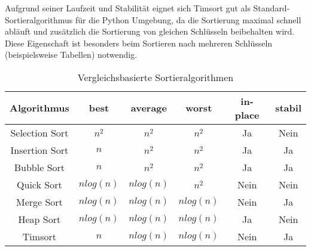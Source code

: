 \begin{description}
Aufgrund seiner Laufzeit und Stabilität eignet sich Timsort gut als Standard-Sortieralgorithmus für die Python Umgebung, da die Sortierung maximal schnell abläuft und zusätzlich die Sortierung von gleichen Schlüsseln beibehalten wird. Diese Eigenschaft ist besonders beim Sortieren nach mehreren Schlüsseln (beispielsweise Tabellen) notwendig.
\begin{table}[H]
\centering
\begin{tabular}{|c|c|c|c|c|c|}
\hline
Algorithmus & best & average & worst & in-place & stabil \\ \hline
Selection Sort & $n^2$ & $n^2$ & $n^2$ & Ja & Nein \\ \hline
Insertion Sort & $n$ &$ n^2$ &$ n^2$ & Ja & Ja \\ \hline
Bubble Sort & $n$ & $n^2$ & $n^2$ & Ja & Ja \\ \hline
Quick Sort & $n log(n)$ & $n log(n)$ & $n^2$ & Nein & Nein \\ \hline
Merge Sort & $n log(n)$ & $n log(n)$ & $n log(n)$ & Nein & Ja \\ \hline
Heap Sort & $n log(n)$ & $n log(n)$ & $n log(n)$ & Ja & Nein \\ \hline
Timsort & $n$ & $n log(n)$ & $n log(n)$ & Nein & Ja \\ \hline
\end{tabular}
\caption{Vergleichsbasierte Sortieralgorithmen}
\end{table}
\end{description}






